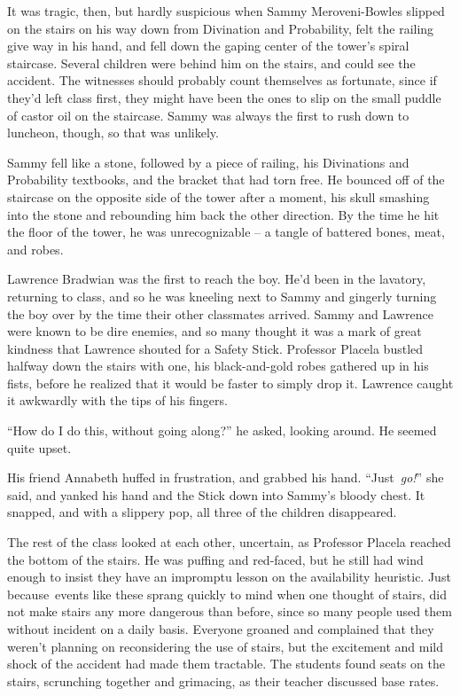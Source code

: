 It was tragic, then, but hardly suspicious when Sammy Meroveni-Bowles
slipped on the stairs on his way down from Divination and Probability,
felt the railing give way in his hand, and fell down the gaping center
of the tower's spiral staircase. Several children were behind him on the
stairs, and could see the accident. The witnesses should probably count
themselves as fortunate, since if they'd left class first, they might
have been the ones to slip on the small puddle of castor oil on the
staircase. Sammy was always the first to rush down to luncheon, though,
so that was unlikely.

Sammy fell like a stone, followed by a piece of railing, his Divinations
and Probability textbooks, and the bracket that had torn free. He
bounced off of the staircase on the opposite side of the tower after a
moment, his skull smashing into the stone and rebounding him back the
other direction. By the time he hit the floor of the tower, he was
unrecognizable -- a tangle of battered bones, meat, and robes.

Lawrence Bradwian was the first to reach the boy. He'd been in the
lavatory, returning to class, and so he was kneeling next to Sammy and
gingerly turning the boy over by the time their other classmates
arrived. Sammy and Lawrence were known to be dire enemies, and so many
thought it was a mark of great kindness that Lawrence shouted for a
Safety Stick. Professor Placela bustled halfway down the stairs with
one, his black-and-gold robes gathered up in his fists, before he
realized that it would be faster to simply drop it. Lawrence caught it
awkwardly with the tips of his fingers.

``How do I do this, without going along?'' he asked, looking around. He
seemed quite upset.

His friend Annabeth huffed in frustration, and grabbed his hand.
``Just~\emph{go!}'' she said, and yanked his hand and the Stick down
into Sammy's bloody chest. It snapped, and with a slippery pop, all
three of the children disappeared.

The rest of the class looked at each other, uncertain, as Professor
Placela reached the bottom of the stairs. He was puffing and red-faced,
but he still had wind enough to insist they have an impromptu lesson on
the availability heuristic. Just because~events like these sprang
quickly to mind when one thought of stairs, did not make stairs any more
dangerous than before, since so many people used them without incident
on a daily basis. Everyone groaned and complained that they weren't
planning on reconsidering the use of stairs, but the excitement and mild
shock of the accident had made them tractable. The students found seats
on the stairs, scrunching together and grimacing, as their teacher
discussed base rates.

